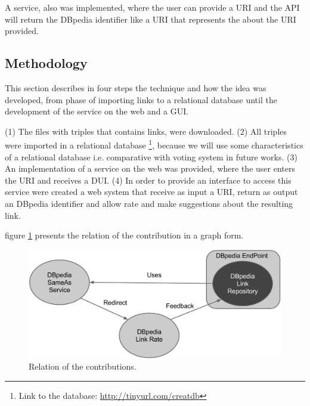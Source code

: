 A service, also was implemented, where the user can provide a URI and the API will return the DBpedia identifier like a URI that represents the  about the URI provided.

\subsection{Methodology}
This section describes in four steps the technique and how the idea was developed, from phase of importing links to a relational database until the development of the service on the web and a GUI.

(1) The files with triples that contains  links, were downloaded.
(2) All triples were imported in a relational database \footnote{Link to the database: \url{http://tinyurl.com/creatdb}}, because we will use some characteristics of a relational database i.e. comparative with voting system in future works.
(3) An implementation of a service on the web was provided, where the user enters the URI and receives a DUI.
(4) In order to provide an interface to access this service were created a web system that receive as input a URI, return as output an DBpedia identifier and allow rate and make suggestions about the resulting link.


figure \ref{fig:contrib} presents the relation of the contribution in a graph form.

\begin{figure}[hbt] 
  	\centering
	\includegraphics[width=\columnwidth]{img/contribution.png}
  	\caption{Relation of the contributions.}
  	\label{fig:contrib}
\end{figure}

